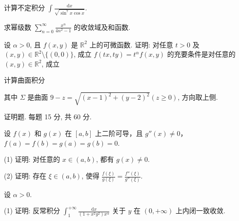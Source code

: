 计算不定积分 $\int \frac{\mathrm{d}x}{\sqrt{\sin^7 x \cos x}}$.\par
求幂级数 $\sum_{n=0}^{\infty} \frac{x^n}{4n^2 - 1}$ 的收敛域及和函数.\par
\par{}
设 $\alpha > 0$, 且 $f(x, y)$ 是 $\mathbb{R}^2$ 上的可微函数. 证明: 对任意 $t > 0$ 及 $(x, y) \in \mathbb{R}^2 \setminus \{(0, 0)\}$, 成立 $f(tx, ty) = t^\alpha f(x, y)$ 的充要条件是对任意的 $(x, y) \in \mathbb{R}^2$, 成立\par
\nopagebreak[4]
\par{}
计算曲面积分\par
\nopagebreak[4]
其中 $\Sigma$ 是曲面 $9 - z = \sqrt{(x - 1)^2 + (y - 2)^2} (z \geq 0)$, 方向取上侧.\par
\par{}
证明题. 每题 15 分, 共 60 分.\par
设 $f(x)$ 和 $g(x)$ 在 $[a, b]$ 上二阶可导，且 $g''(x) \neq 0$，$f(a) = f(b) = g(a) = g(b) = 0$.\par
(1) 证明: 对任意的 $x \in (a, b)$, 都有 $g(x) \neq 0$.\par
(2) 证明: 存在 $\xi \in (a, b)$, 使得 $\frac{f(\xi)}{g(\xi)} = \frac{f''(\xi)}{g''(\xi)}$.\par
设 $\alpha > 0$.\par
(1) 证明: 反常积分 $\int_{1}^{+\infty} \frac{\mathrm{d}x}{(1 + x^2 y^2) x^\alpha}$ 关于 $y$ 在 $(0, +\infty)$ 上内闭一致收敛.\par
